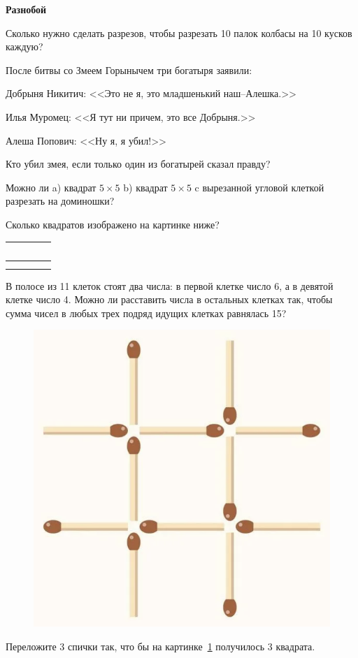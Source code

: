 \documentclass{article}
\begin{document}
    \large

    \begin{center}
        \textbf{Разнобой}
    \end{center}


    \begin{enumerate_boxed}

        \item Сколько нужно сделать разрезов, чтобы разрезать 10 палок колбасы на 10 кусков каждую?

        \item После битвы со Змеем Горынычем три богатыря заявили:

        Добрыня Никитич: <<Это не я, это младшенький наш–Алешка.>>

        Илья Муромец: <<Я тут ни причем, это все Добрыня.>>

        Алеша Попович: <<Ну я, я убил!>>

        Кто убил змея, если только один из богатырей сказал правду?

        \item Можно ли a) квадрат $5 \times 5$ b) квадрат $5 \times 5$ c вырезанной угловой клеткой разрезать на доминошки?

        \item Сколько квадратов изображено на картинке ниже?

        \begin{table}[h]
            \centering
            \begin{tabular}{|c|c|c|c|}
                \hline
                \, & \, & \, & \, \\\hline
                &    &    &    \\\hline
                &    &    &    \\\hline
            \end{tabular}
            \label{tab:table}
        \end{table}

        \item В полосе из 11 клеток стоят два числа: в первой клетке число 6, а в девятой клетке число 4.
        Можно ли расставить числа в остальных клетках так, чтобы сумма чисел в любых трех подряд идущих клетках равнялась 15?
        \begin{figure}[h]
            \centering
            \includegraphics[width=0.3\linewidth]{spichki1}
            \caption{}
            \label{fig:figure3}
        \end{figure}
        \item Переложите 3 спички так, что бы на картинке~\ref{fig:figure3} получилось 3 квадрата.


\end{enumerate_boxed}
\end{document}
